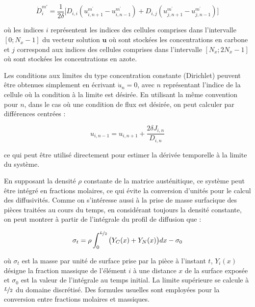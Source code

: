 \[
\dot{D}_{i}^{m\prime}=\frac{1}{2\delta}\big[D_{i,i}(u_{i,n+1}^{m^{\prime}}-u_{i,n-1}^{m^{\prime}})+D_{i,j}(u_{j,n+1}^{m^{\prime}}-u_{j,n-1}^{m^{\prime}})\big]
\]

\noindent où les indices $i$ représentent les indices des cellules comprises dans l'intervalle $[0;N_{x}-1]$ du vecteur solution $\mathbf{u}$ où sont stockées les concentrations en carbone et $j$ correspond aux indices des cellules comprises dans l'intervalle $[N_{x};2N_{x}-1]$ où sont stockées les concentrations en azote.

Les conditions aux limites du type concentration constante (Dirichlet) peuvent être obtenues simplement en écrivant $\dot{u}_{n}=0$, avec $n$ représentant l'indice de la cellule où la condition à la limite est désirée. En utilisant la même convention pour $n$, dans le cas où une condition de flux est désirée, on peut calculer par différences centrées :

\[
u_{i,n-1}=u_{i,n+1}+\frac{2\delta J_{i,n}}{D_{i,n}}
\]

\noindent ce qui peut être utilisé directement pour estimer la dérivée temporelle à la limite du système.

En supposant la densité $\rho$ constante de la matrice austénitique, ce système peut être intégré en fractions molaires, ce qui évite la conversion d'unités pour le calcul des diffusivités. Comme on s'intéresse aussi à la prise de masse surfacique des pièces traitées au cours du temps, en considérant toujours la densité constante, on peut montrer à partir de l'intégrale du profil de diffusion que :

\begin{equation}
\sigma_{t}=\rho\int_{0}^{\nicefrac{L}{2}}\big(Y_{C}(x)+Y_{N}(x)\big)dx-\sigma_{0}
\label{eq:mass_gain}
\end{equation}

\noindent où $\sigma_{t}$ est la masse par unité de surface prise par la pièce à l'instant $t$, $Y_{i}(x)$ désigne la fraction massique de l'élément $i$ à une distance $x$ de la surface exposée et $\sigma_{0}$ est la valeur de l'intégrale au temps initial. La limite supérieure se calcule à $\nicefrac{L}{2}$ du domaine discrétisé. Des formules usuelles sont employées pour la conversion entre fractions molaires et massiques.

\endinput
